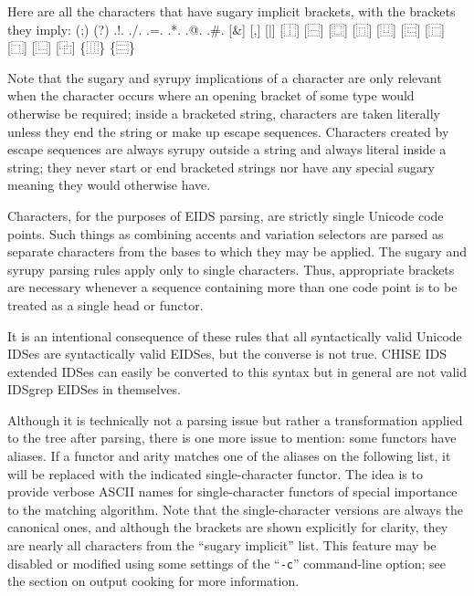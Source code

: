 \documentclass[twocolumn]{report}
\begin{document}
Here are all the characters that have sugary implicit brackets, with the
brackets they imply:  {\ttfamily (;) (?) .!. ./. .=. .*. .@. .\#. [\&] [,]
[|] [⿰] [⿱] [⿴] [⿵] [⿶] [⿷] [⿸] [⿹] [⿺] [⿻] \{⿲\} \{⿳\}}

Note that the sugary and syrupy implications of a character are only
relevant when the character occurs where an opening bracket of some type
would otherwise be required; inside a bracketed string, characters are taken
literally unless they end the string or make up escape sequences. 
Characters created by escape sequences are always syrupy outside a
string and always literal inside a string; they never start or end bracketed
strings nor have any special sugary meaning they would otherwise have.

Characters, for the purposes of EIDS parsing, are strictly single Unicode
code points.
Such things as combining accents and variation selectors are parsed as
separate characters from the bases to which they may be applied.
The sugary and syrupy parsing rules apply only to single characters.
Thus, appropriate brackets are necessary whenever a sequence containing
more than one code point is to be treated as a single head or functor.

It is an intentional consequence of these rules that all syntactically valid
Unicode IDSes are syntactically valid EIDSes, but the converse is not true. 
CHISE IDS extended IDSes can easily be converted to this syntax but in
general are not valid IDSgrep EIDSes in themselves.

Although it is technically not a parsing issue but rather a
transformation applied to the tree after parsing, there is one more
issue to mention: some functors have aliases.  If a functor and arity
matches one of the aliases on the following list, it will be replaced
with the indicated single-character functor.  The idea is to provide
verbose ASCII names for single-character functors of special
importance to the matching algorithm.  Note that the single-character
versions are always the canonical ones, and although the brackets are
shown explicitly for clarity, they are nearly all characters from the
``sugary implicit'' list.  This feature may be disabled or modified using
some settings of the ``\texttt{-c}'' command-line option; see the section
on output cooking for more information.
\end{document}
